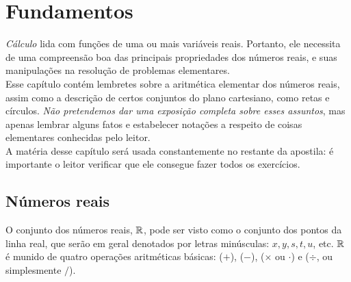 

\chapter{Fundamentos}
\label{Cap_Fundam}



\ifdefined\updateans
\fi

\emph{Cálculo} lida com funções de uma ou mais variáveis reais. 
Portanto, ele necessita de uma compreensão boa das principais propriedades dos 
números reais, e suas manipulações na resolução de problemas elementares.\\

Esse capítulo contém lembretes sobre a aritmética elementar dos números reais, 
assim como a descrição de certos conjuntos do plano cartesiano, como retas e
círculos.
\emph{Não pretendemos dar uma exposição completa sobre esses assuntos}, mas 
apenas lembrar alguns fatos e estabelecer notações a respeito de coisas
elementares conhecidas pelo leitor.\\

A matéria desse capítulo será usada constantemente no restante da apostila: é 
importante o leitor verificar que ele consegue fazer todos os exercícios.

\section{Números reais}
O conjunto dos números reais, $\mathbb{R}$, pode ser visto como o conjunto dos pontos 
da linha real, que serão em geral denotados por letras minúsculas: $x,y,s,t,u$,
etc.
$\mathbb{R}$ é munido de quatro operações aritméticas básicas:  ($+$), 
 ($-$),  ($\times$ ou 
$\cdot$) e  ($\div$, ou simplesmente $/$).\\

